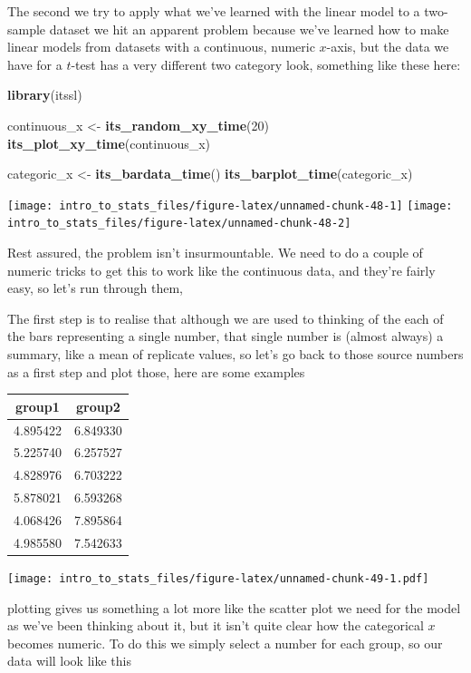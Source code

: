 \documentclass[
]{book}
\newenvironment{Shaded}{\begin{snugshade}}{\end{snugshade}}
\newcommand{\DecValTok}[1]{\textcolor[rgb]{0.00,0.00,0.81}{#1}}
\newcommand{\KeywordTok}[1]{\textcolor[rgb]{0.13,0.29,0.53}{\textbf{#1}}}
\newcommand{\NormalTok}[1]{#1}
\newcommand{\StringTok}[1]{\textcolor[rgb]{0.31,0.60,0.02}{#1}}
\begin{document}
The second we try to apply what we've learned with the linear model to a two-sample dataset we hit an apparent problem because we've learned how to make linear models from datasets with a continuous, numeric \(x\)-axis, but the data we have for a \(t\)-test has a very different two category look, something like these here:

\begin{Shaded}
\begin{Highlighting}[]
\KeywordTok{library}\NormalTok{(itssl)}

\NormalTok{continuous_x <-}\StringTok{ }\KeywordTok{its_random_xy_time}\NormalTok{(}\DecValTok{20}\NormalTok{)}
\KeywordTok{its_plot_xy_time}\NormalTok{(continuous_x)}

\NormalTok{categoric_x <-}\StringTok{ }\KeywordTok{its_bardata_time}\NormalTok{()}
\KeywordTok{its_barplot_time}\NormalTok{(categoric_x)}
\end{Highlighting}
\end{Shaded}

\texttt{[image: intro\_to\_stats\_files/figure-latex/unnamed-chunk-48-1]} \texttt{[image: intro\_to\_stats\_files/figure-latex/unnamed-chunk-48-2]}

Rest assured, the problem isn't insurmountable. We need to do a couple of numeric tricks to get this to work like the continuous data, and they're fairly easy, so let's run through them,

The first step is to realise that although we are used to thinking of the each of the bars representing a single number, that single number is (almost always) a summary, like a mean of replicate values, so let's go back to those source numbers as a first step and plot those, here are some examples

\begin{tabular}{c|c}
\hline
group1 & group2\\
\hline
4.895422 & 6.849330\\
\hline
5.225740 & 6.257527\\
\hline
4.828976 & 6.703222\\
\hline
5.878021 & 6.593268\\
\hline
4.068426 & 7.895864\\
\hline
4.985580 & 7.542633\\
\hline
\end{tabular}

\texttt{[image: intro\_to\_stats\_files/figure-latex/unnamed-chunk-49-1.pdf]}

plotting gives us something a lot more like the scatter plot we need for the model as we've been thinking about it, but it isn't quite clear how the categorical \(x\) becomes numeric. To do this we simply select a number for each group, so our data will look like this
\end{document}
